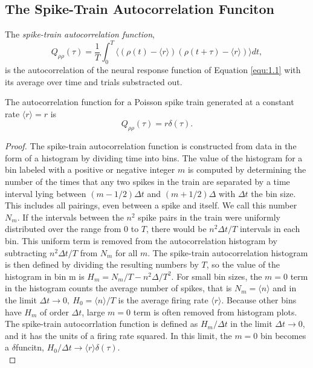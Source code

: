 \subsection{The Spike-Train Autocorrelation Funciton}

\begin{defn}
  The \emph{spike-train autocorrelation function},
  \begin{equation}
    Q_{\rho\rho}(\tau)=\frac{1}{T}\int^T_0 \langle (\rho(t)-\langle r \rangle)(\rho(t+\tau)-\langle r\rangle)\rangle dt,
    \label{equ:1.35}
  \end{equation} is the autocorrelation of the neural response function of Equation \ref{equ:1.1} with its average over time and trials substracted out. 
\end{defn}

\begin{thm}
  The autocorrelation function for a Poisson spike train generated at a constant rate $\langle r \rangle =r$ is 
  \begin{equation}
    \label{equ:1.36}
    Q_{\rho\rho}(\tau)=r\delta(\tau).
  \end{equation}
  \begin{proof}
    The spike-train autocorrelation function is constructed from data in the form of a histogram by dividing time into bins. The value of the histogram for a bin labeled with a positive or negative integer $m$ is computed by determining the number of the times that any two spikes in the train are separated by a time interval lying between $(m-1/2)\Delta t$ and $(m+1/2)\Delta $ with $\Delta t$ the bin size.  This includes all pairings, even  between a spike and itself. We call this number $N_m$. If the intervals between the $n^2$ spike pairs in the train were uniformly distributed over the range from $0$ to $T$, there would be $n^2\Delta t/T$ intervals in each bin. This uniform term is removed from the autocorrelation histogram by subtracting $n^2\Delta t /T$ from $N_m$ for all $m$. The spike-train autocorrelation histogram is then defined by dividing the resulting numbers by $T$, so the value of the histogram in bin m is $H_m=N_m/T-n^2\Delta /T^2$. For small bin sizes, the $m = 0$ term in the histogram counts the average number of spikes,  that is $N_m = \langle n \rangle $ and in the limit $\Delta t \to 0,\ H_0=\langle n \rangle /T$ is the average firing rate $\langle r \rangle$. Because other bins have $H_m$ of order $\Delta t$, large $m = 0$ term is often removed from histogram plots. The spike-train autocorrlation function is defined as $H_m/\Delta t$ in the limit $\Delta t \to 0$, and it has the units of a firing rate squared. In this limit,  the $m = 0$ bin becomes a $\delta $funcitn, $H_0/\Delta t\to \langle r\rangle \delta (\tau)$.\\

\end{proof}
\end{thm}
